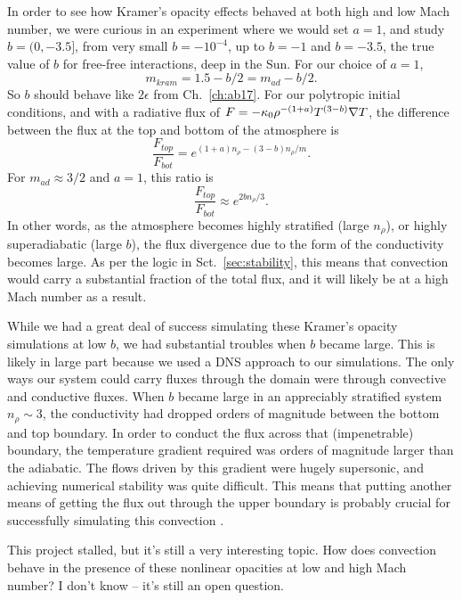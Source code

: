 In order to see how Kramer's opacity effects behaved at both high and low Mach number, we were curious in an experiment where we would set $a = 1$, and study $b = (0, -3.5]$, from very small $b = -10^{-4}$, up to $b = -1$ and $b = -3.5$, the true value of $b$ for free-free interactions, deep in the Sun. 
For our choice of $a = 1$,
\begin{equation}
m_{kram} = 1.5 - b/2 = m_{ad} - b/2.
\end{equation}
So $b$ should behave like $2\epsilon$ from Ch.~\ref{ch:ab17}.
For our polytropic initial conditions, and with a radiative flux of $F = -\kappa_0 \rho^{-(1+a)}T^{(3-b)} \nabla T$, the difference between the flux at the top and bottom of the atmosphere is
\begin{equation}
\frac{F_{top}}{F_{bot}} =  e^{(1+a)n_\rho - (3-b)n_\rho / m}.
\end{equation}
For $m_{ad} \approx 3/2$ and $a = 1$, this ratio is
$$
\frac{F_{top}}{F_{bot}} \approx e^{2 b n_\rho / 3}.
$$
In other words, as the atmosphere becomes highly stratified (large $n_\rho$), or highly superadiabatic (large $b$), the flux divergence due to the form of the conductivity becomes large.
As per the logic in Sct.~\ref{sec:stability}, this means that convection would carry a substantial fraction of the total flux, and it will likely be at a high Mach number as a result.

While we had a great deal of success simulating these Kramer's opacity simulations at low $b$, we had substantial troubles when $b$ became large.
This is likely in large part because we used a DNS approach to our simulations.
The only ways our system could carry fluxes through the domain were through convective and conductive fluxes.
When $b$ became large in an appreciably stratified system $n_\rho \sim 3$, the conductivity had dropped orders of magnitude between the bottom and top boundary.
In order to conduct the flux across that (impenetrable) boundary, the temperature gradient required was orders of magnitude larger than the adiabatic.
The flows driven by this gradient were hugely supersonic, and achieving numerical stability was quite difficult.
This means that putting another means of getting the flux out through the upper boundary is probably crucial for successfully simulating this convection \citep[e.g., the SGS flux in][]{kapyla&all2017}.

This project stalled, but it's still a very interesting topic.
How does convection behave in the presence of these nonlinear opacities at low and high Mach number?
I don't know -- it's still an open question.

